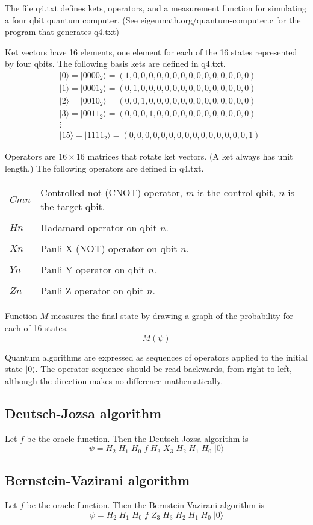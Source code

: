 \documentclass[12pt]{article}
\begin{document}
\noindent
The file q4.txt defines kets, operators, and a measurement function
for simulating a four qbit quantum computer.
(See eigenmath.org/quantum-computer.c for the program that generates q4.txt)

\bigskip
\noindent
Ket vectors have 16 elements, one element for each of the 16 states represented by four qbits.
The following basis kets are defined in q4.txt.
\begin{align*}
&|0\rangle=|0000_2\rangle=(1,0,0,0,0,0,0,0,0,0,0,0,0,0,0,0)
\\
&|1\rangle=|0001_2\rangle=(0,1,0,0,0,0,0,0,0,0,0,0,0,0,0,0)
\\
&|2\rangle=|0010_2\rangle=(0,0,1,0,0,0,0,0,0,0,0,0,0,0,0,0)
\\
&|3\rangle=|0011_2\rangle=(0,0,0,1,0,0,0,0,0,0,0,0,0,0,0,0)
\\
&\vdots
\\
&|15\rangle=|1111_2\rangle=(0,0,0,0,0,0,0,0,0,0,0,0,0,0,0,1)
\end{align*}

\noindent
Operators are $16\times16$ matrices that rotate ket vectors.
(A ket always has unit length.)
The following operators are defined in q4.txt.

\bigskip
\begin{tabular}{l l}
$Cmn$ & Controlled not (CNOT) operator, $m$ is the control qbit, $n$ is the target qbit.
\\
\\
$Hn$ & Hadamard operator on qbit $n$.
\\
\\
$Xn$ & Pauli X (NOT) operator on qbit $n$.
\\
\\
$Yn$ & Pauli Y operator on qbit $n$.
\\
\\
$Zn$ & Pauli Z operator on qbit $n$.
\end{tabular}

\bigskip
\noindent
Function $M$ measures the final state by drawing a graph of the probability
for each of 16 states.
\begin{equation*}
M(\psi)
\end{equation*}

\noindent
Quantum algorithms are expressed as sequences of operators applied
to the initial state $|0\rangle$.
The operator sequence should be read backwards, from right to left,
although the direction makes no difference mathematically.

\subsection*{Deutsch-Jozsa algorithm}
Let $f$ be the oracle function.
Then the Deutsch-Jozsa algorithm is
\begin{equation*}
\psi = H_2 \; H_1 \; H_0 \; f \; H_3 \; X_3 \; H_2 \; H_1 \; H_0 \; |0\rangle
\end{equation*}

\subsection*{Bernstein-Vazirani algorithm}
Let $f$ be the oracle function.
Then the Bernstein-Vazirani algorithm is
\begin{equation*}
\psi = H_2 \; H_1 \; H_0 \; f \; Z_3 \; H_3 \; H_2 \; H_1 \; H_0 \; |0\rangle
\end{equation*}
\end{document}
